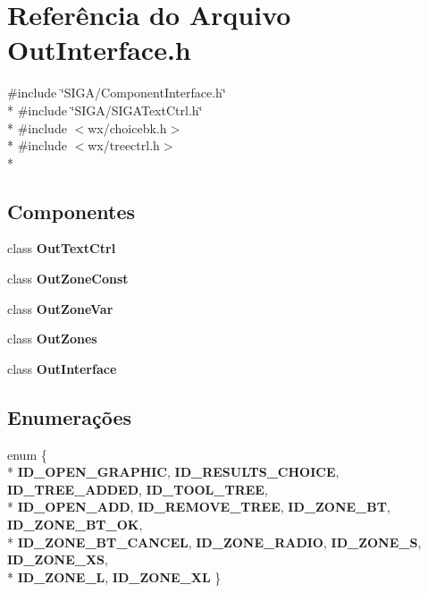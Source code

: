 \section{Referência do Arquivo Out\+Interface.\+h}
\label{_out_interface_8h}
{\ttfamily \#include \char`\"{}S\+I\+G\+A/\+Component\+Interface.\+h\char`\"{}}\\*
{\ttfamily \#include \char`\"{}S\+I\+G\+A/\+S\+I\+G\+A\+Text\+Ctrl.\+h\char`\"{}}\\*
{\ttfamily \#include $<$wx/choicebk.\+h$>$}\\*
{\ttfamily \#include $<$wx/treectrl.\+h$>$}\\*
\subsection*{Componentes}
\begin{DoxyCompactItemize}
\item 
class {\bf Out\+Text\+Ctrl}
\item 
class {\bf Out\+Zone\+Const}
\item 
class {\bf Out\+Zone\+Var}
\item 
class {\bf Out\+Zones}
\item 
class {\bf Out\+Interface}
\end{DoxyCompactItemize}
\subsection*{Enumerações}
\begin{DoxyCompactItemize}
\item 
enum \{ \\*
{\bf I\+D\+\_\+\+O\+P\+E\+N\+\_\+\+G\+R\+A\+P\+H\+IC}, 
{\bf I\+D\+\_\+\+R\+E\+S\+U\+L\+T\+S\+\_\+\+C\+H\+O\+I\+CE}, 
{\bf I\+D\+\_\+\+T\+R\+E\+E\+\_\+\+A\+D\+D\+ED}, 
{\bf I\+D\+\_\+\+T\+O\+O\+L\+\_\+\+T\+R\+EE}, 
\\*
{\bf I\+D\+\_\+\+O\+P\+E\+N\+\_\+\+A\+DD}, 
{\bf I\+D\+\_\+\+R\+E\+M\+O\+V\+E\+\_\+\+T\+R\+EE}, 
{\bf I\+D\+\_\+\+Z\+O\+N\+E\+\_\+\+BT}, 
{\bf I\+D\+\_\+\+Z\+O\+N\+E\+\_\+\+B\+T\+\_\+\+OK}, 
\\*
{\bf I\+D\+\_\+\+Z\+O\+N\+E\+\_\+\+B\+T\+\_\+\+C\+A\+N\+C\+EL}, 
{\bf I\+D\+\_\+\+Z\+O\+N\+E\+\_\+\+R\+A\+D\+IO}, 
{\bf I\+D\+\_\+\+Z\+O\+N\+E\+\_\+S}, 
{\bf I\+D\+\_\+\+Z\+O\+N\+E\+\_\+\+XS}, 
\\*
{\bf I\+D\+\_\+\+Z\+O\+N\+E\+\_\+L}, 
{\bf I\+D\+\_\+\+Z\+O\+N\+E\+\_\+\+XL}
 \}
\end{DoxyCompactItemize}
